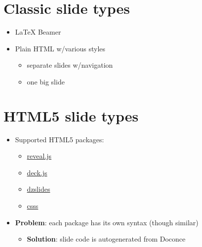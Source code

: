 \documentclass[%
twoside,                 %
draft,                   %
final,                   %
chapterprefix=true,      %
open=right               %
10pt]{book}
\begin{document}
\begin{shadedquoteBlue}


\section*{Classic slide types}

\begin{itemize}
 \item {\LaTeX} Beamer

 \item Plain HTML w/various styles
\begin{itemize}

   \item separate slides w/navigation

   \item one big slide
\end{itemize}

\noindent
\end{itemize}

\noindent
\section*{HTML5 slide types}

\begin{itemize}
 \item Supported HTML5 packages:
\begin{itemize}

   \item \href{{http://lab.hakim.se/reveal-js/}}{reveal.js}

   \item \href{{http://imakewebthings.com/deck.js/}}{deck.js}

   \item \href{{http://paulrouget.com/dzslides/}}{dzslides}

   \item \href{{http://leaverou.github.com/csss/#intro}}{csss}

\end{itemize}

\noindent
 \item \textbf{Problem}: each package has its own syntax (though similar)
\begin{itemize}

   \item \textbf{Solution}: slide code is autogenerated from Doconce

\end{itemize}


\end{itemize}
\end{shadedquoteBlue}
\end{document}

